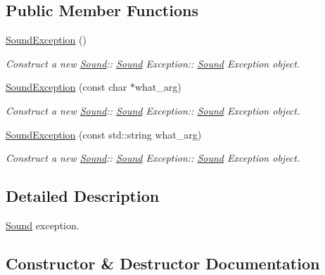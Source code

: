 \subsection*{Public Member Functions}
\begin{DoxyCompactItemize}
\item 
\mbox{\label{class_sound_1_1_sound_exception_a758ae58fca4e0240dd6dd6eea1bbe313}} 
\hyperlink{class_sound_1_1_sound_exception_a758ae58fca4e0240dd6dd6eea1bbe313}{Sound\+Exception} ()
\begin{DoxyCompactList}\small\item\em Construct a new \hyperlink{class_sound}{Sound}\+:\+: \hyperlink{class_sound}{Sound} Exception\+:\+: \hyperlink{class_sound}{Sound} Exception object. \end{DoxyCompactList}\item 
\hyperlink{class_sound_1_1_sound_exception_a97c8bf542e7412f95f3773c142888064}{Sound\+Exception} (const char $\ast$what\+\_\+arg)
\begin{DoxyCompactList}\small\item\em Construct a new \hyperlink{class_sound}{Sound}\+:\+: \hyperlink{class_sound}{Sound} Exception\+:\+: \hyperlink{class_sound}{Sound} Exception object. \end{DoxyCompactList}\item 
\hyperlink{class_sound_1_1_sound_exception_ad587317200c7d021303a588cff844473}{Sound\+Exception} (const std\+::string what\+\_\+arg)
\begin{DoxyCompactList}\small\item\em Construct a new \hyperlink{class_sound}{Sound}\+:\+: \hyperlink{class_sound}{Sound} Exception\+:\+: \hyperlink{class_sound}{Sound} Exception object. \end{DoxyCompactList}\end{DoxyCompactItemize}


\subsection{Detailed Description}
\hyperlink{class_sound}{Sound} exception. 

\subsection{Constructor \& Destructor Documentation}
\mbox{\label{class_sound_1_1_sound_exception_a97c8bf542e7412f95f3773c142888064}} 
